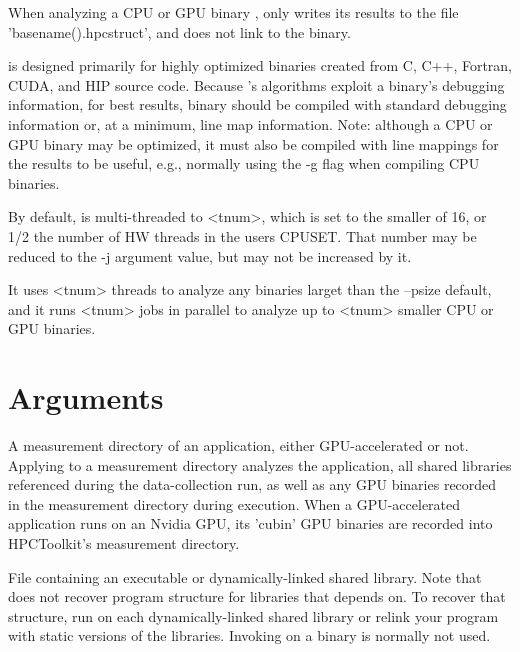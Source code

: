\documentclass[english]{article}
\begin{document}
When analyzing a CPU or GPU binary ,  only writes its results to the file
'basename().hpcstruct', and does not link to the binary.

 is designed primarily for highly optimized binaries created from
C, C++, Fortran, CUDA, and HIP source code. Because 's algorithms exploit a
binary's debugging information, for best results, binary should be compiled
with standard debugging information or, at a minimum, line map information.
Note: although a CPU or GPU binary may be optimized, it must also be
compiled with line mappings for the results to be useful, e.g., normally using the -g
flag when compiling CPU binaries. 

By default,  is multi-threaded to <tnum>, which is set to the smaller
of 16, or 1/2 the number of HW threads in the users CPUSET.  That number may be reduced
to the -j argument value, but may not be increased by it.

It uses <tnum> threads to analyze any binaries larget than the --psize default, and it
runs <tnum> jobs in parallel to analyze up to <tnum> smaller CPU or GPU binaries.


\section{Arguments}


\begin{Description}
\item[\Arg{measurement directory}]
A measurement directory of an application, either GPU-accelerated or not.
Applying  to a measurement directory analyzes the application, all shared libraries referenced
during the data-collection run, as well as any GPU binaries recorded 
in the measurement directory during execution. 
When a GPU-accelerated application runs on an Nvidia GPU, its 'cubin' GPU binaries are recorded into 
HPCToolkit's measurement directory.

\item[\Arg{binary}] File containing an executable or dynamically-linked shared library.
Note that  does not recover program structure for libraries that  depends on.
To recover that structure, run  on each dynamically-linked shared library
or relink your program with static versions of the libraries.  Invoking  on a binary
is normally not used.

\end{Description}
\end{document}
